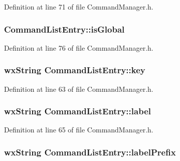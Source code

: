 Definition at line 71 of file Command\+Manager.\+h.

\subsubsection[{\texorpdfstring{is\+Global}{isGlobal}}]{ Command\+List\+Entry\+::is\+Global}\hypertarget{struct_command_list_entry_a09a01397d7558faa2ee53df38424d8bb}{}\label{struct_command_list_entry_a09a01397d7558faa2ee53df38424d8bb}


Definition at line 76 of file Command\+Manager.\+h.

\subsubsection[{\texorpdfstring{key}{key}}]{\setlength{\rightskip}{0pt plus 5cm}wx\+String Command\+List\+Entry\+::key}\hypertarget{struct_command_list_entry_ac690c17d4e1e5a682f7b597801f516ee}{}\label{struct_command_list_entry_ac690c17d4e1e5a682f7b597801f516ee}


Definition at line 63 of file Command\+Manager.\+h.

\subsubsection[{\texorpdfstring{label}{label}}]{\setlength{\rightskip}{0pt plus 5cm}wx\+String Command\+List\+Entry\+::label}\hypertarget{struct_command_list_entry_a62ce08e96eb023705953e0b1dfc7be33}{}\label{struct_command_list_entry_a62ce08e96eb023705953e0b1dfc7be33}


Definition at line 65 of file Command\+Manager.\+h.

\subsubsection[{\texorpdfstring{label\+Prefix}{labelPrefix}}]{\setlength{\rightskip}{0pt plus 5cm}wx\+String Command\+List\+Entry\+::label\+Prefix}\hypertarget{struct_command_list_entry_a74ff5648445bb81eca0b2bcaa49489e6}{}\label{struct_command_list_entry_a74ff5648445bb81eca0b2bcaa49489e6}


